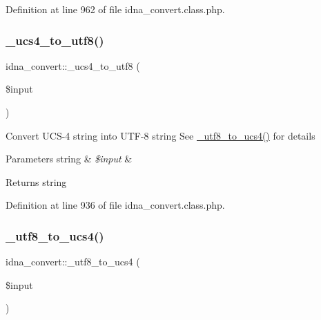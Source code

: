 Definition at line 962 of file idna\+\_\+convert.\+class.\+php.

\mbox{\label{classidna__convert_a3827709d9c0e35a164838064f73daea5}} 
\subsubsection{\texorpdfstring{\+\_\+ucs4\+\_\+to\+\_\+utf8()}{\_ucs4\_to\_utf8()}}
{\footnotesize\ttfamily idna\+\_\+convert\+::\+\_\+ucs4\+\_\+to\+\_\+utf8 (\begin{DoxyParamCaption}\item[{}]{\$input }\end{DoxyParamCaption})\hspace{0.3cm}{\ttfamily [protected]}}

Convert U\+C\+S-\/4 string into U\+T\+F-\/8 string See \hyperlink{classidna__convert_abafc3eb23a9da5e7b53c5f9f8b7ee035}{\+\_\+utf8\+\_\+to\+\_\+ucs4()} for details 
\begin{DoxyParams}[1]{Parameters}
string & {\em \$input} & \\
\hline
\end{DoxyParams}
\begin{DoxyReturn}{Returns}
string 
\end{DoxyReturn}


Definition at line 936 of file idna\+\_\+convert.\+class.\+php.

\mbox{\label{classidna__convert_abafc3eb23a9da5e7b53c5f9f8b7ee035}} 
\subsubsection{\texorpdfstring{\+\_\+utf8\+\_\+to\+\_\+ucs4()}{\_utf8\_to\_ucs4()}}
{\footnotesize\ttfamily idna\+\_\+convert\+::\+\_\+utf8\+\_\+to\+\_\+ucs4 (\begin{DoxyParamCaption}\item[{}]{\$input }\end{DoxyParamCaption})\hspace{0.3cm}{\ttfamily [protected]}}

